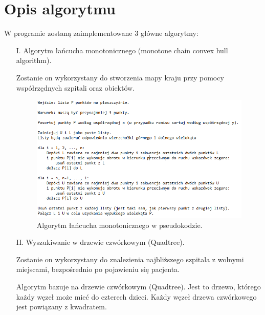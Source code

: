 \documentclass{article}
\begin{document}
\newpage
\section{Opis algorytmu}

    W programie zostaną zaimplementowane 3 główne algorytmy:
    
    \begin{itemize}
        \item[I.] Algorytm łańcucha monotonicznego (monotone chain convex hull algorithm).
            
            \vspace{2mm}
            Zostanie on wykorzystany do stworzenia mapy kraju przy pomocy współrzędnych szpitali oraz obiektów.
            
            \begin{figure}[ht]
                \centering
                \includegraphics[scale = 0.6]{Monotone.png}
                \caption{Algorytm łańcucha monotonicznego w pseudokodzie.}
            \end{figure}
    
        \item[II.] Wyszukiwanie w drzewie czwórkowym (Quadtree).
        
            \vspace{2mm}
            Zostanie on wykorzystany do znalezienia najbliższego szpitala z wolnymi miejscami, bezpośrednio po pojawieniu się pacjenta.
            
            \vspace{2mm}
            \qquad Algorytm bazuje na drzewie czwórkowym (Quadtree). Jest to drzewo, którego każdy węzeł może mieć do czterech dzieci. Każdy węzeł drzewa czwórkowego jest powiązany z kwadratem. 
            

\end{itemize}
\end{document}
